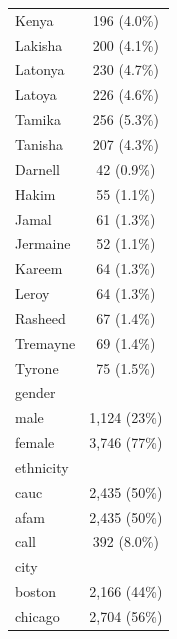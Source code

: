 \documentclass[
  11pt,
]{book}
\numberwithin{equation}{section}
\numberwithin{countremarque}{section}
\begin{document}
\begin{longtable}{lc}
\hspace{1em}Kenya & 196 (4.0\%)\\
\hspace{1em}Lakisha & 200 (4.1\%)\\
\hspace{1em}Latonya & 230 (4.7\%)\\
\addlinespace
\hspace{1em}Latoya & 226 (4.6\%)\\
\hspace{1em}Tamika & 256 (5.3\%)\\
\hspace{1em}Tanisha & 207 (4.3\%)\\
\hspace{1em}Darnell & 42 (0.9\%)\\
\hspace{1em}Hakim & 55 (1.1\%)\\
\addlinespace
\hspace{1em}Jamal & 61 (1.3\%)\\
\hspace{1em}Jermaine & 52 (1.1\%)\\
\hspace{1em}Kareem & 64 (1.3\%)\\
\hspace{1em}Leroy & 64 (1.3\%)\\
\hspace{1em}Rasheed & 67 (1.4\%)\\
\addlinespace
\hspace{1em}Tremayne & 69 (1.4\%)\\
\hspace{1em}Tyrone & 75 (1.5\%)\\
gender & \\
\hspace{1em}male & 1,124 (23\%)\\
\hspace{1em}female & 3,746 (77\%)\\
\addlinespace
ethnicity & \\
\hspace{1em}cauc & 2,435 (50\%)\\
\hspace{1em}afam & 2,435 (50\%)\\
call & 392 (8.0\%)\\
city & \\
\addlinespace
\hspace{1em}boston & 2,166 (44\%)\\
\hspace{1em}chicago & 2,704 (56\%)\\

\end{longtable}
\end{document}
